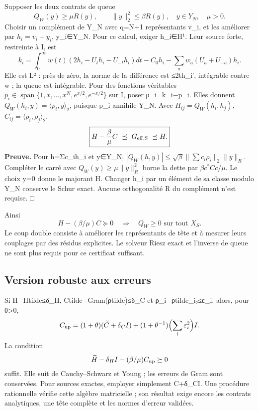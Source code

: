 \documentclass[
  10pt,
  a4paper,
]{article}
\begin{document}
Supposer les deux contrats de queue \[
Q_W(y)\ge\mu R(y),\qquad\|y\|_2^2\le\beta R(y),\quad y\in Y_N,\quad\mu>0.
\] Choisir un complément de Y\_N avec q=N+1 représentants v\_i, et les
améliorer par \(h_i=v_i+y_i\), y\_i∈Y\_N. Pour ce calcul, exiger
h\_i∈H¹. Leur source forte, restreinte à I, est \[
k_i=\int_0^\infty w(t)(2h_i-U_th_i-U_{-t}h_i)dt
-C_0h_i-\sum_a w_a(U_a+U_{-a})h_i.
\] Elle est L² : près de zéro, la norme de la différence est
≤2t\textbar\textbar h\_i′\textbar\textbar, intégrable contre w ; la
queue est intégrable. Pour des fonctions véritables
\(p_i\in\operatorname{span}\{1,x,\ldots,x^N,e^{x/2},e^{-x/2}\}\) sur I,
poser ρ\_i=k\_i−p\_i. Elles donnent
\(Q_W(h_i,y)=\langle\rho_i,y\rangle_2\), puisque p\_i annihile Y\_N.
Avec \(H_{ij}=Q_W(h_i,h_j)\), \(C_{ij}=\langle\rho_i,\rho_j\rangle_2\),
\[
\boxed{H-\frac\beta\mu C\ \preceq\ G_{\rm eff,S}\ \preceq H.}
\] \textbf{Preuve.} Pour h=Σc\_ih\_i et y∈Y\_N,
\(|Q_W(h,y)|\le\sqrt\beta\|\sum c_i\rho_i\|_2\|y\|_R\). Compléter le
carré avec \(Q_W(y)\ge\mu\|y\|_R^2\) borne la dette par
\(\beta c^*Cc/\mu\). Le choix y=0 donne le majorant H. Changer h\_i par
un élément de sa classe modulo Y\_N conserve le Schur exact. Aucune
orthogonalité R du complément n'est requise. □

Ainsi \[
H-(\beta/\mu)C\succeq0\quad\Longrightarrow\quad Q_W\ge0\text{ sur tout }X_S.
\] Le coup double consiste à améliorer les représentants de tête et à
mesurer leurs couplages par des résidus explicites. Le solveur Riesz
exact et l'inverse de queue ne sont plus requis pour ce certificat
suffisant.

\hypertarget{version-robuste-aux-erreurs}{%
\subsection{Version robuste aux
erreurs}\label{version-robuste-aux-erreurs}}

Si \textbar\textbar H−Htilde\textbar\textbar≤δ\_H,
\textbar\textbar Ctilde−Gram(ρtilde)\textbar\textbar≤δ\_C et
\textbar\textbar ρ\_i−ρtilde\_i\textbar\textbar₂≤ε\_i, alors, pour
θ\textgreater0, \[
C_{\rm up}=(1+\theta)(\widetilde C+\delta_C I)
+(1+\theta^{-1})\Bigl(\sum_i\varepsilon_i^2\Bigr)I.
\] La condition \[
\widetilde H-\delta_HI-(\beta/\mu)C_{\rm up}\succeq0
\] suffit. Elle suit de Cauchy--Schwarz et Young ; les erreurs de Gram
sont conservées. Pour sources exactes, employer simplement C+δ\_CI. Une
procédure rationnelle vérifie cette algèbre matricielle ; son résultat
exige encore les contrats analytiques, une tête complète et les normes
d'erreur validées.
\end{document}
